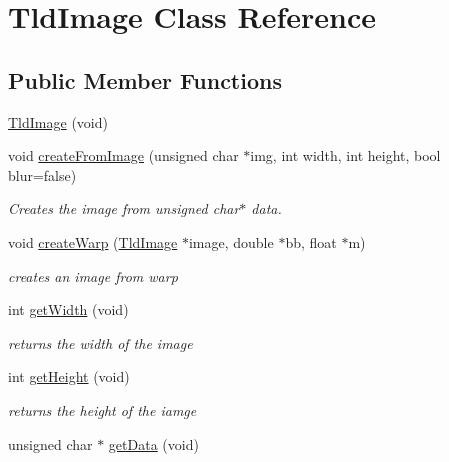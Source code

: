 \hypertarget{class_tld_image}{\section{\-Tld\-Image \-Class \-Reference}
\label{class_tld_image}
}
\subsection*{\-Public \-Member \-Functions}
\begin{DoxyCompactItemize}
\item 
\hyperlink{class_tld_image_a2d81efea2c69616960d5b030d842475d}{\-Tld\-Image} (void)
\item 
void \hyperlink{class_tld_image_a8884c4c71f01c9f34d401e7465822777}{create\-From\-Image} (unsigned char $\ast$img, int width, int height, bool blur=false)
\begin{DoxyCompactList}\small\item\em \-Creates the image from unsigned char$\ast$ data. \end{DoxyCompactList}\item 
void \hyperlink{class_tld_image_a8727b774600ad628e991c3c326148aef}{create\-Warp} (\hyperlink{class_tld_image}{\-Tld\-Image} $\ast$image, double $\ast$bb, float $\ast$m)
\begin{DoxyCompactList}\small\item\em creates an image from warp \end{DoxyCompactList}\item 
\hypertarget{class_tld_image_a0bc1e16e93b27d15f135c02bc5479ee6}{int \hyperlink{class_tld_image_a0bc1e16e93b27d15f135c02bc5479ee6}{get\-Width} (void)}\label{class_tld_image_a0bc1e16e93b27d15f135c02bc5479ee6}

\begin{DoxyCompactList}\small\item\em returns the width of the image \end{DoxyCompactList}\item 
\hypertarget{class_tld_image_a554e2bdede2475a4ceff02162b48df62}{int \hyperlink{class_tld_image_a554e2bdede2475a4ceff02162b48df62}{get\-Height} (void)}\label{class_tld_image_a554e2bdede2475a4ceff02162b48df62}

\begin{DoxyCompactList}\small\item\em returns the height of the iamge \end{DoxyCompactList}\item 
\hypertarget{class_tld_image_ad19dace551432b972c17be5efabe8393}{unsigned char $\ast$ \hyperlink{class_tld_image_ad19dace551432b972c17be5efabe8393}{get\-Data} (void)}\label{class_tld_image_ad19dace551432b972c17be5efabe8393}


\end{DoxyCompactItemize}
